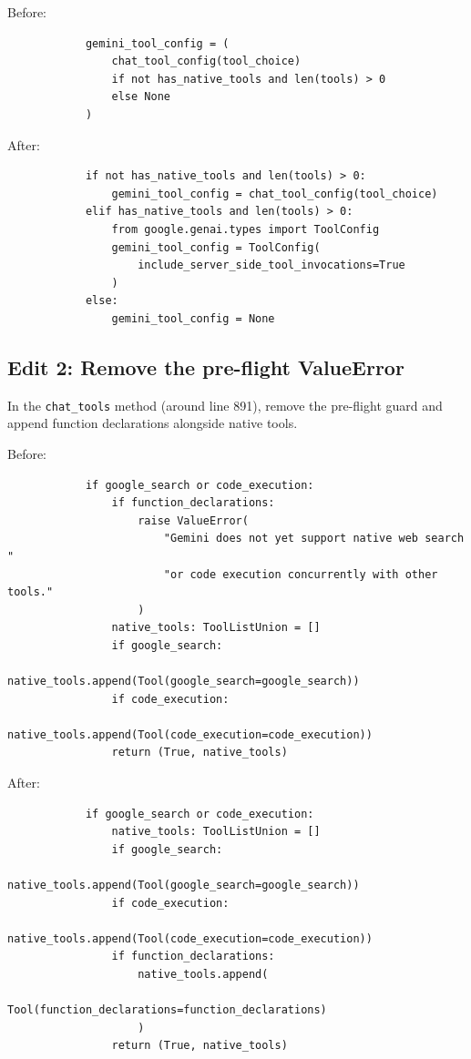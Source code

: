\documentclass[10pt]{article} %
\begin{document}
            Before:
            \begin{verbatim}
            gemini_tool_config = (
                chat_tool_config(tool_choice)
                if not has_native_tools and len(tools) > 0
                else None
            )
            \end{verbatim}
            
            After:
            \begin{verbatim}
            if not has_native_tools and len(tools) > 0:
                gemini_tool_config = chat_tool_config(tool_choice)
            elif has_native_tools and len(tools) > 0:
                from google.genai.types import ToolConfig
                gemini_tool_config = ToolConfig(
                    include_server_side_tool_invocations=True
                )
            else:
                gemini_tool_config = None
            \end{verbatim}
        
        \subsection{Edit 2: Remove the pre-flight ValueError}
        
            In the \texttt{chat\_tools} method (around line 891), remove the pre-flight guard and append function declarations alongside native tools.
            
            Before:
            \begin{verbatim}
            if google_search or code_execution:
                if function_declarations:
                    raise ValueError(
                        "Gemini does not yet support native web search "
                        "or code execution concurrently with other tools."
                    )
                native_tools: ToolListUnion = []
                if google_search:
                    native_tools.append(Tool(google_search=google_search))
                if code_execution:
                    native_tools.append(Tool(code_execution=code_execution))
                return (True, native_tools)
            \end{verbatim}
            
            After:
            \begin{verbatim}
            if google_search or code_execution:
                native_tools: ToolListUnion = []
                if google_search:
                    native_tools.append(Tool(google_search=google_search))
                if code_execution:
                    native_tools.append(Tool(code_execution=code_execution))
                if function_declarations:
                    native_tools.append(
                        Tool(function_declarations=function_declarations)
                    )
                return (True, native_tools)
            \end{verbatim}
        
\end{document}
